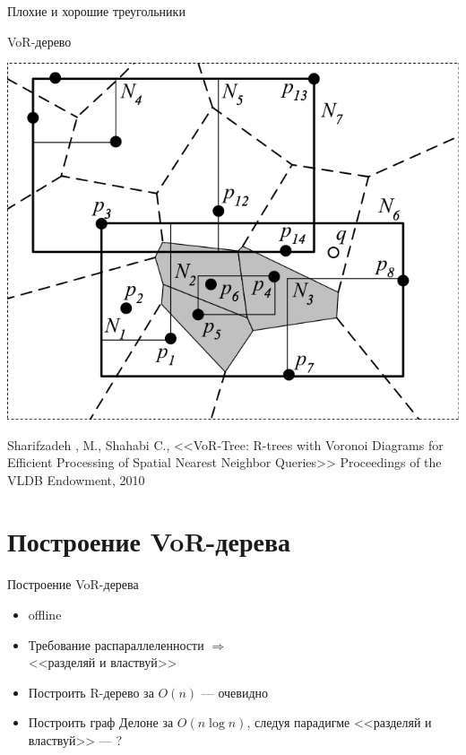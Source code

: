 \documentclass[14pt, fleqn, xcolor={dvipsnames, table}]{beamer}
\begin{document}
\begin{frame}{Плохие и хорошие треугольники}
\begin{center}
	        \end{center}       
        \end{frame}
        
        \begin{frame}{VoR-дерево}
            \begin{center}
	            \includegraphics[scale = 0.3]{vor-tree.png}
	            
	            {\tiny Sharifzadeh , M., Shahabi C., <<VoR-Tree: R-trees with Voronoi Diagrams for Efficient Processing of Spatial Nearest Neighbor Queries>> Proceedings of the VLDB Endowment, 2010}	  
	        \end{center}   
        \end{frame}
        
    \section{Построение VoR-дерева}    
    
        \begin{frame}{Построение VoR-дерева}
            \begin{itemize}
                \item offline
                \item Требование распараллеленности $\Longrightarrow$ \\ <<разделяй и властвуй>> 
                \item Построить R-дерево за $O(n)$ --- очевидно
                \item Построить граф Делоне за $O(n \log n)$, следуя парадигме <<разделяй и властвуй>> --- ?
            \end{itemize}
        \end{frame}
        
\end{document}
